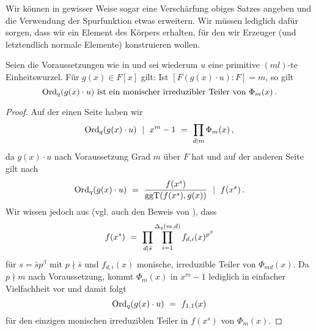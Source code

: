 Wir können in gewisser Weise sogar eine Verschärfung obiges Satzes angeben und
die Verwendung der Spurfunktion etwas erweitern. Wir müssen lediglich dafür
sorgen, dass wir ein Element des Körpers erhalten, für den wir Erzeuger (und
letztendlich normale Elemente) konstruieren wollen.

\begin{satz}
  \label{satz:q_ordnung_von_zusammensetzen}
  Seien die Voraussetzungen wie in  und 
  sei wiederum $u$ eine primitive $(ml)$-te Einheitswurzel. 
  Für $g(x) \in F[x]$ gilt:
  Ist $[F(g(x)\cdot u) : F] = m$, so gilt
  \[ \operatorname{Ord}_q(g(x)\cdot u) \text{ ist ein monischer irreduzibler Teiler von }
    \Phi_m(x)\,. \]
\end{satz}
\begin{proof}
  Auf der einen Seite haben wir 
  \[ \operatorname{Ord}_q(g(x)\cdot u) \ \mid\  x^m-1 \ =\  \prod_{d\mid m} \Phi_m(x)\,, \]
  da $g(x) \cdot u$ nach Voraussetzung Grad $m$ über $F$ hat und auf der
  anderen Seite gilt nach 
  \[ \operatorname{Ord}_q(g(x)\cdot u) \ =\  \frac{f(x^s)}{\operatorname{ggT}(f(x^s), g(x))} 
    \ \mid\  f(x^s) \,.\]
  Wir wissen jedoch aus  (vgl. auch den Beweis von
  ), dass 
  \[ f(x^s) \ =\  \prod_{d\mid \bar s} 
    \prod_{i=1}^{\Delta_q(m,d)} f_{d,i}(x)^{p^\beta}\]
  für $s = \bar sp^\beta$ mit $p\nmid \bar s$ und
  $f_{d,i}(x)$ monische, irreduzible Teiler von $\Phi_{md}(x)$. Da 
  $p\nmid m$ nach Voraussetzung, kommt $\Phi_m(x)$ in $x^m-1$ lediglich in
  einfacher Vielfachheit vor und damit folgt
  \[ \operatorname{Ord}_q(g(x)\cdot u) \ =\  f_{1,1}(x)\]
  für den einzigen monischen irreduziblen Teiler in $f(x^s)$ von $\Phi_m(x)$.
\end{proof}


